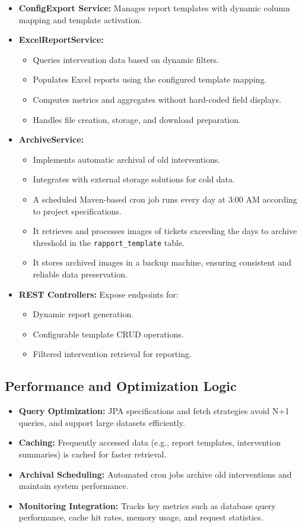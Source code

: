 \begin{itemize}
\item \textbf{ConfigExport Service:} Manages report templates with dynamic column mapping and template activation.
\item \textbf{ExcelReportService:} 
  \begin{itemize}
    \item Queries intervention data based on dynamic filters.
    \item Populates Excel reports using the configured template mapping.
    \item Computes metrics and aggregates without hard-coded field displays.
    \item Handles file creation, storage, and download preparation.
  \end{itemize}
\item \textbf{ArchiveService:} 
  \begin{itemize}
    \item Implements automatic archival of old interventions.
    \item Integrates with external storage solutions for cold data.
    \item A scheduled Maven-based cron job runs every day at 3:00 AM according to project specifications.
    \item It retrieves and processes images of tickets exceeding the days to archive threshold in the \texttt{rapport\_template} table.
    \item It stores archived images in a backup machine, ensuring consistent and reliable data preservation.
  \end{itemize}
\item \textbf{REST Controllers:} Expose endpoints for:
  \begin{itemize}
    \item Dynamic report generation.
    \item Configurable template CRUD operations.
    \item Filtered intervention retrieval for reporting.
  \end{itemize}
\end{itemize}

\subsection{Performance and Optimization Logic}

\begin{itemize}
\item \textbf{Query Optimization:} JPA specifications and fetch strategies avoid N+1 queries, and support large datasets efficiently.
\item \textbf{Caching:} Frequently accessed data (e.g., report templates, intervention summaries) is cached for faster retrieval.
\item \textbf{Archival Scheduling:} Automated cron jobs archive old interventions and maintain system performance.
\item \textbf{Monitoring Integration:} Tracks key metrics such as database query performance, cache hit rates, memory usage, and request statistics.
\end{itemize}

